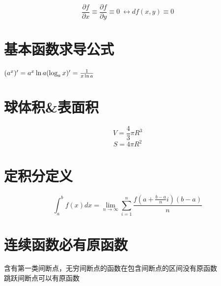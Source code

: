 \documentclass[UTF8]{ctexart}
\begin{document}
$$ \frac{\partial f}{\partial x} \equiv \frac{\partial f}{\partial y} \equiv 0\ \leftrightarrow df({x,y}) \equiv 0 $$

\section{基本函数求导公式}
$ (a^x)'=a^x \ln a \\
  ( \log _a x)'=\frac{1}{x \ln a} $

\section{球体积\&表面积}
$$ V=\frac{4}{3} \pi R^3$$
$$ S= 4 \pi R^2$$

\section{定积分定义}
$$ \int_a^b f(x)dx= \lim_{n \rightarrow \infty } \sum_{i=1}^n \frac{f \left( a+ \frac{b-a}{n}i \right)(b-a)}{n}$$
\section{连续函数必有原函数}
含有第一类间断点，无穷间断点的函数在包含间断点的区间没有原函数   \\
跳跃间断点可以有原函数 \\
\end{document}
